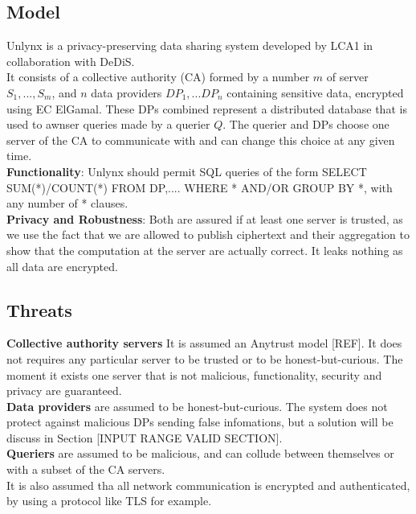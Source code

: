 \documentclass{article}
\begin{document}
\subsection{Model}
Unlynx is a privacy-preserving data sharing system developed by LCA1 in collaboration with DeDiS.\\
It consists of a collective authority (CA) formed by a number $m$ of server $S_1,...,S_m$, and $n$ data providers $DP_1,...DP_n$ containing sensitive data, encrypted using EC ElGamal. These DPs combined represent a distributed database that is used to awnser queries made by a querier $Q$. The querier and DPs choose one server of the CA to communicate with and can change this choice at any given time.\\
\textbf{Functionality}: Unlynx should permit SQL queries of the form SELECT SUM(*)/COUNT(*) FROM DP,.... WHERE * AND/OR GROUP BY *, with any number of * clauses.\\
\textbf{Privacy and Robustness}: Both are assured if at least one server is trusted, as we use the fact that we are allowed to publish ciphertext and their aggregation to show that the computation at the server are actually correct. It leaks nothing as all data are encrypted.

\subsection{Threats}
\textbf{Collective authority servers} It is assumed an Anytrust model [REF]. It does not requires any particular server to be trusted or to be honest-but-curious. The moment it exists one server that is not malicious, functionality, security and privacy are guaranteed.\\
\textbf{Data providers} are assumed to be honest-but-curious. The system does not protect against malicious DPs sending false infomations, but a solution will be discuss  in Section [INPUT RANGE VALID SECTION].\\
\textbf{Queriers} are assumed to be malicious, and can collude between themselves or with a subset of the CA servers.\\
It is also assumed tha all network communication is encrypted and authenticated, by using a protocol like TLS for example.
\end{document}
